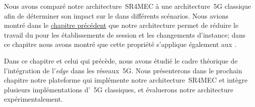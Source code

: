 \documentclass[../main.tex]{subfiles}
\begin{document}
Nous avons comparé notre architecture~SR4MEC à une architecture~5G classique afin de déterminer son impact sur le  dans différents scénarios.
Nous avions montré dans le \hyperref[ch:edge-services-integration]{chapitre précédent} que notre architecture permet de réduire le travail du  pour les établissements de session et les changements d’instance; dans ce chapitre nous avons montré que cette propriété s’applique également aux .

Dans ce chapitre et celui qui précède, nous avons étudié le cadre théorique de l’intégration de l’\textit{edge} dans les réseaux~5G.
Nous présenterons dans le prochain chapitre notre plateforme qui implémente notre architecture~SR4MEC et intègre plusieurs implémentations d’~5G classiques, et évaluerons notre architecture expérimentalement.
\end{document}
